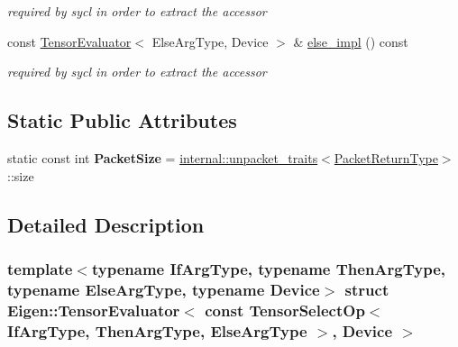 \begin{DoxyCompactItemize}
\begin{DoxyCompactList}\small\item\em required by sycl in order to extract the accessor \end{DoxyCompactList}\item 
\mbox{\label{struct_eigen_1_1_tensor_evaluator_3_01const_01_tensor_select_op_3_01_if_arg_type_00_01_then_arg_346b931156fad56ae8aa875afe41cb55_a29162f5f68ca5bb5cd7d431523a6e8e9}} 
const \hyperlink{struct_eigen_1_1_tensor_evaluator}{Tensor\+Evaluator}$<$ Else\+Arg\+Type, Device $>$ \& \hyperlink{struct_eigen_1_1_tensor_evaluator_3_01const_01_tensor_select_op_3_01_if_arg_type_00_01_then_arg_346b931156fad56ae8aa875afe41cb55_a29162f5f68ca5bb5cd7d431523a6e8e9}{else\+\_\+impl} () const
\begin{DoxyCompactList}\small\item\em required by sycl in order to extract the accessor \end{DoxyCompactList}\end{DoxyCompactItemize}
\subsection*{Static Public Attributes}
\begin{DoxyCompactItemize}
\item 
\mbox{\label{struct_eigen_1_1_tensor_evaluator_3_01const_01_tensor_select_op_3_01_if_arg_type_00_01_then_arg_346b931156fad56ae8aa875afe41cb55_a6aef1282d3d0e5ae2ed80af566ee1546}} 
static const int {\bfseries Packet\+Size} = \hyperlink{struct_eigen_1_1internal_1_1unpacket__traits}{internal\+::unpacket\+\_\+traits}$<$\hyperlink{group___sparse_core___module}{Packet\+Return\+Type}$>$\+::size
\end{DoxyCompactItemize}


\subsection{Detailed Description}
\subsubsection*{template$<$typename If\+Arg\+Type, typename Then\+Arg\+Type, typename Else\+Arg\+Type, typename Device$>$\newline
struct Eigen\+::\+Tensor\+Evaluator$<$ const Tensor\+Select\+Op$<$ If\+Arg\+Type, Then\+Arg\+Type, Else\+Arg\+Type $>$, Device $>$}



